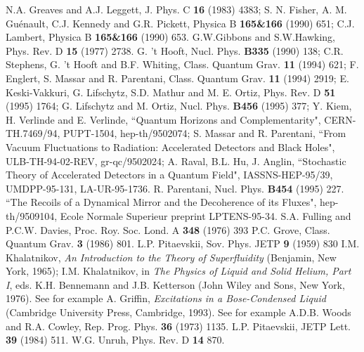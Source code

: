 \begin{thebibliography}{99}
N.A. Greaves and A.J. Leggett, J. Phys. C {\bf 16} (1983) 4383;
S. N. Fisher, A. M. Gu\'enault, C.J. Kennedy and G.R. Pickett,
Physica B {\bf 165\&166} (1990) 651;
C.J. Lambert, Physica B {\bf 165\&166} (1990) 653.
G.W.Gibbons and S.W.Hawking, Phys. Rev. D {\bf 15} (1977) 2738.
G. 't Hooft, Nucl. Phys. {\bf B335} (1990) 138; 
C.R. Stephens, G. 't Hooft and B.F. Whiting, Class. Quantum Grav. {\bf 11}
(1994) 621; 
F. Englert, S. Massar and R. Parentani, Class. Quantum Grav. {\bf 11}
(1994) 2919; 
E. Keski-Vakkuri, G. Lifschytz, S.D. Mathur and M. E. Ortiz, Phys. Rev. D
{\bf 51} (1995) 1764;
G. Lifschytz and M. Ortiz, Nucl. Phys. {\bf B456} (1995) 377;
Y. Kiem, H. Verlinde and E. Verlinde, ``Quantum Horizons and Complementarity",
CERN-TH.7469/94, PUPT-1504, hep-th/9502074;
S. Massar and R. Parentani, ``From Vacuum Fluctuations to Radiation:
Accelerated Detectors and Black Holes", ULB-TH-94-02-REV, gr-qc/9502024;
A. Raval, B.L. Hu, J. Anglin, ``Stochastic Theory of Accelerated
Detectors in a Quantum Field", IASSNS-HEP-95/39, UMDPP-95-131, LA-UR-95-1736.
R. Parentani, Nucl. Phys. {\bf B454} (1995) 227.
 ``The Recoils of a Dynamical Mirror
and the Decoherence of its Fluxes", hep-th/9509104, Ecole Normale Superieur
preprint LPTENS-95-34.
S.A. Fulling and P.C.W. Davies, Proc. Roy. Soc. Lond. A {\bf 348} (1976) 393
P.C. Grove, Class. Quantum Grav. {\bf 3} (1986) 801.
L.P. Pitaevskii, Sov. Phys. JETP {\bf 9} (1959) 830
I.M. Khalatnikov, {\it An Introduction to the Theory of 
Superfluidity} (Benjamin, New York, 1965); 
I.M. Khalatnikov, in {\it The Physics of Liquid and
Solid Helium, Part I}, eds. K.H. Bennemann and J.B. Ketterson (John Wiley and
Sons, New York, 1976).
See for example A. Griffin, {\it Excitations in a Bose-Condensed
Liquid} (Cambridge University Press, Cambridge, 1993).
See for example A.D.B. Woods and R.A. Cowley,
Rep. Prog. Phys. {\bf 36} (1973) 1135.
L.P. Pitaevskii, JETP Lett. {\bf 39} (1984) 511.
W.G. Unruh, Phys. Rev. D {\bf 14} 870.
\end{thebibliography}







